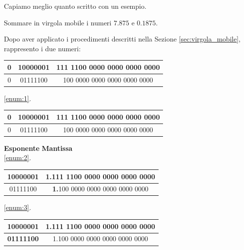 Capiamo meglio quanto scritto con un esempio.
\begin{example}[Addizione]
    Sommare in virgola mobile i numeri $7.875$ e $0.1875$.
    
    Dopo aver applicato i procedimenti descritti nella Sezione \ref{sec:virgola_mobile}, rappresento i due numeri:
    \begin{center}
    \begin{tabular}{|c|c|c|}
        \hline0 & 10000001 & 111 1100 0000 0000 0000 0000\\\hline
        \hline0 & 01111100 & 100 0000 0000 0000 0000 0000\\\hline
    \end{tabular}
    \end{center}
    \begin{center}
    \ref{enum:1}.\hspace{1cm}
    \begin{tabular}{|c|c|c|}
        \hline0 & 10000001 & 111 1100 0000 0000 0000 0000\\\hline
        \hline0 & 01111100 & 100 0000 0000 0000 0000 0000\\\hline
    \end{tabular}
    \end{center}
    \begin{center}
    \textbf{Esponente} \hspace{2cm} \textbf{Mantissa}\\
    \ref{enum:2}.\hspace{1cm}
    \begin{tabular}{|c|c|}
        \hline 10000001 & \textbf{1.}111 1100 0000 0000 0000 0000\\\hline
        \hline 01111100 & \textbf{1.}100 0000 0000 0000 0000 0000\\\hline
    \end{tabular}
    \end{center}
    \begin{center}
    \ref{enum:3}.\hspace{1cm}
    \begin{tabular}{|c|c|}
        \hline 10000001 & 1.111 1100 0000 0000 0000 0000\\\hline
        \hline \textbf{01111100} & 1.100 0000 0000 0000 0000 0000\\\hline
    \end{tabular}
    \end{center}
    \begin{center}

\end{center}
\end{example}
